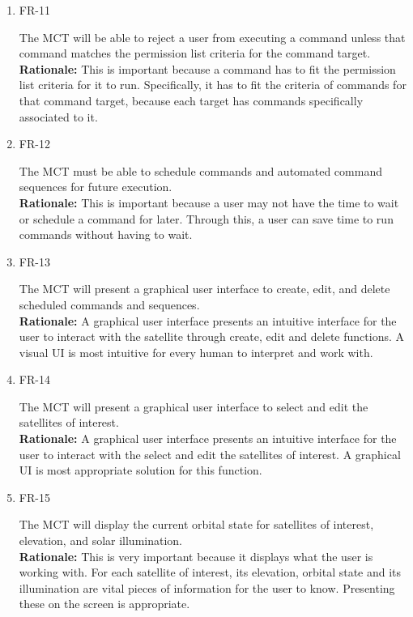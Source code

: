 \documentclass[12pt]{article}
\begin{document}
\begin{enumerate}
    \item{FR-11\\}
    
    The MCT will be able to reject a user from executing a command unless that command matches the permission list criteria for the command target. \\
    \textbf{Rationale:} This is important because a command has to fit the permission list criteria for it to run. Specifically, it has to fit the criteria of commands for that command target, because each target has commands specifically associated to it. 

    \item{FR-12\\}
    
    The MCT must be able to schedule commands and automated command sequences for future execution. \\
    \textbf{Rationale:} This is important because a user may not have the time to wait or schedule a command for later. Through this, a user can save time to run commands without having to wait. 

    \item{FR-13\\}
        
    The MCT will present a graphical user interface to create, edit, and delete scheduled commands and sequences. \\
    \textbf{Rationale:} A graphical user interface presents an intuitive interface for the user to interact with the satellite through create, edit and delete functions. A visual UI is most intuitive for every human to interpret and work with. 

    \item{FR-14\\}

    The MCT will present a graphical user interface to select and edit the satellites of interest. \\
    \textbf{Rationale:} A graphical user interface presents an intuitive interface for the user to interact with the select and edit the satellites of interest. A graphical UI is most appropriate solution for this function.

    \item{FR-15\\}    

    The MCT will display the current orbital state for satellites of interest, elevation, and solar illumination. \\
    \textbf{Rationale:} This is very important because it displays what the user is working with. For each satellite of interest, its elevation, orbital state and its illumination are vital pieces of information for the user to know. Presenting these on the screen is appropriate. 
    

\end{enumerate}
\end{document}
